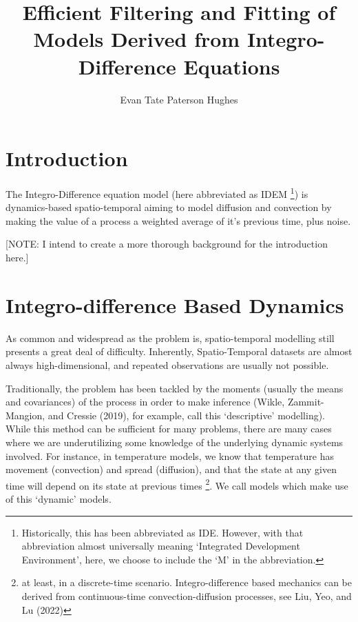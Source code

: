 \documentclass[
]{report}
\title{Efficient Filtering and Fitting of Models Derived from
Integro-Difference Equations}
\author{Evan Tate Paterson Hughes}
\date{}
\renewcommand*\contentsname{Table of contents}
\newcommand\contentsname{Table of contents}
\theoremstyle{plain}
\theoremstyle{plain}
\theoremstyle{plain}
\theoremstyle{remark}
\begin{document}
\maketitle

\renewcommand*\contentsname{Table of contents}
{
\hypersetup{linkcolor=}
\setcounter{tocdepth}{2}
\tableofcontents
}

\chapter{Introduction}\label{introduction}

The Integro-Difference equation model (here abbreviated as IDEM
\footnote{Historically, this has been abbreviated as IDE. However, with
  that abbreviation almost universally meaning `Integrated Development
  Environment', here, we choose to include the `M' in the abbreviation.})
is dynamics-based spatio-temporal aiming to model diffusion and
convection by making the value of a process a weighted average of it's
previous time, plus noise.

{{[}NOTE: I intend to create a more thorough background for the
introduction here.{]}}

\chapter{Integro-difference Based
Dynamics}\label{integro-difference-based-dynamics}

As common and widespread as the problem is, spatio-temporal modelling
still presents a great deal of difficulty. Inherently, Spatio-Temporal
datasets are almost always high-dimensional, and repeated observations
are usually not possible.

Traditionally, the problem has been tackled by the moments (usually the
means and covariances) of the process in order to make inference (Wikle,
Zammit-Mangion, and Cressie (2019), for example, call this `descriptive'
modelling). While this method can be sufficient for many problems, there
are many cases where we are underutilizing some knowledge of the
underlying dynamic systems involved. For instance, in temperature
models, we know that temperature has movement (convection) and spread
(diffusion), and that the state at any given time will depend on its
state at previous times \footnote{at least, in a discrete-time scenario.
  Integro-difference based mechanics can be derived from continuous-time
  convection-diffusion processes, see Liu, Yeo, and Lu (2022)}. We call
models which make use of this `dynamic' models.
\end{document}
